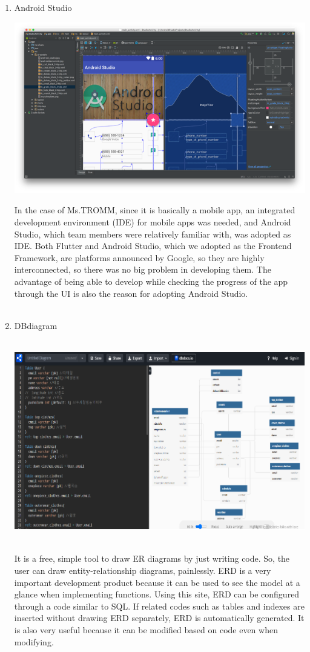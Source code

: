 \documentclass[conference]{IEEEtran}
\begin{document}
\begin{enumerate}
    \item Android Studio \\ 
\centerline{\includegraphics{as.png}}
    In the case of Ms.TROMM, since it is basically a mobile app, an integrated development environment (IDE) for mobile apps was needed, and Android Studio, which team members were relatively familiar with, was adopted as IDE. Both Flutter and Android Studio, which we adopted as the Frontend Framework, are platforms announced by Google, so they are highly interconnected, so there was no big problem in developing them. The advantage of being able to develop while checking the progress of the app through the UI is also the reason for adopting Android Studio. \\ \\
    \item DBdiagram \\ \\
\centerline{\includegraphics{DB.png}}
\\ It is a free, simple tool to draw ER diagrams by just writing code. So, the user can draw entity-relationship diagrams, painlessly. ERD is a very important development product because it can be used to see the model at a glance when implementing functions. Using this site, ERD can be configured through a code similar to SQL. If related codes such as tables and indexes are inserted without drawing ERD separately, ERD is automatically generated. It is also very useful because it can be modified based on code even when modifying.\\ \\ \\ \\

\end{enumerate}
\end{document}
